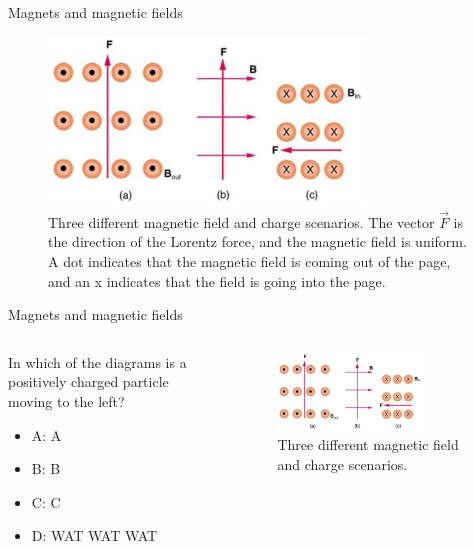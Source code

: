 \documentclass{beamer}
\begin{document}
\begin{frame}{Magnets and magnetic fields}
\begin{figure}
\centering
\includegraphics[width=0.75\textwidth]{figures/lorentzProblem.png}
\caption{\label{fig:lorentzProblem} Three different magnetic field and charge scenarios.  The vector $\vec{F}$ is the direction of the Lorentz force, and the magnetic field is uniform.  A dot indicates that the magnetic field is coming out of the page, and an x indicates that the field is going into the page.}
\end{figure}
\end{frame}

\begin{frame}{Magnets and magnetic fields}
\begin{columns}[T]
\begin{column}{0.3\textwidth}
In which of the diagrams is a positively charged particle moving to the left?
\begin{itemize}
\item A: A
\item B: B
\item C: C
\item D: WAT WAT WAT
\end{itemize}
\end{column}
\begin{column}{0.7\textwidth}
\begin{figure}
\centering
\includegraphics[width=0.75\textwidth]{figures/lorentzProblem.png}
\caption{\label{fig:lorentzProblem2} Three different magnetic field and charge scenarios.}
\end{figure}
\end{column}
\end{columns}
\end{frame}
\end{document}
